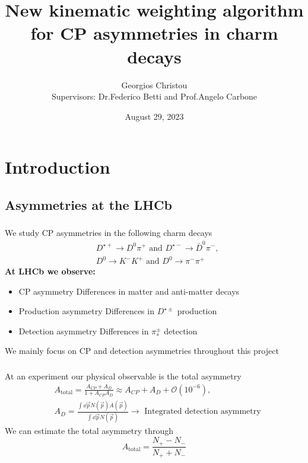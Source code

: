 \documentclass{beamer}
\title[\href{https://summerstudent.web.cern.ch/home}{CERN Summer Student Programme 2023}]
{     
      New kinematic weighting algorithm for CP asymmetries in charm decays
}
\author[\href{https://github.com/GiorgosChr}{Georgios Christou}]
{Georgios Christou
\\
Supervisors: Dr.\@ Federico Betti and Prof.\@ Angelo Carbone}
\institute[\href{https://lhcb.web.cern.ch/}{LHCb}]
{
      LHCb Collaboration
}
\date{August 29, 2023}
\begin{document}
\frame{\titlepage}
\begin{frame}
      \tableofcontents
\end{frame}

\section{Introduction}
\subsection{Asymmetries at the LHCb}

\begin{frame}
      \frametitle{\insertsubsectionhead}
      \rightarrow We study CP asymmetries in the following charm decays
      \begin{eqnarray*}
            &D^{\star+}\to D^0\pi^+ \text{ and } D^{\star-}\to \bar{D}^0\pi^-, \nonumber\\
            &D^0 \to K^-K^+ \text{ and } D^0 \to \pi^-\pi^+
    \end{eqnarray*}
      \textbf{At LHCb we observe:}
      \begin{itemize}
            \item CP asymmetry \rightarrow Differences in matter and anti-matter decays
            \item Production asymmetry \rightarrow Differences in $D^{\star\pm}$ production
            \item Detection asymmetry \rightarrow Differences in $\pi_s^{\pm}$ detection
      \end{itemize}
      \bigbreak
      \rightarrow We mainly focus on CP and detection asymmetries throughout this project
\end{frame}

\begin{frame}
      \frametitle{\insertsubsectionhead}
      \rightarrow At an experiment our physical observable is the total asymmetry
      \begin{eqnarray*}
            &A_\text{total} = \frac{A_{CP} + A_{D}}{1 + A_{CP}A_D}\approx A_{CP} + A_{D} + \mathcal{O}(10^{-6}),\nonumber\\
            &A_{D} = \frac{\int \dd \vec{p} N(\vec{p})A(\vec{p})}{\int \dd \vec{p} N(\vec{p})}\to \text{ Integrated detection asymmetry}
      \end{eqnarray*}
      \rightarrow We can estimate the total asymmetry through
      \begin{equation*}
            A_\text{total} = \frac{N_+ - N_-}{N_+ + N_-}
      \end{equation*}
\end{frame}
\end{document}
